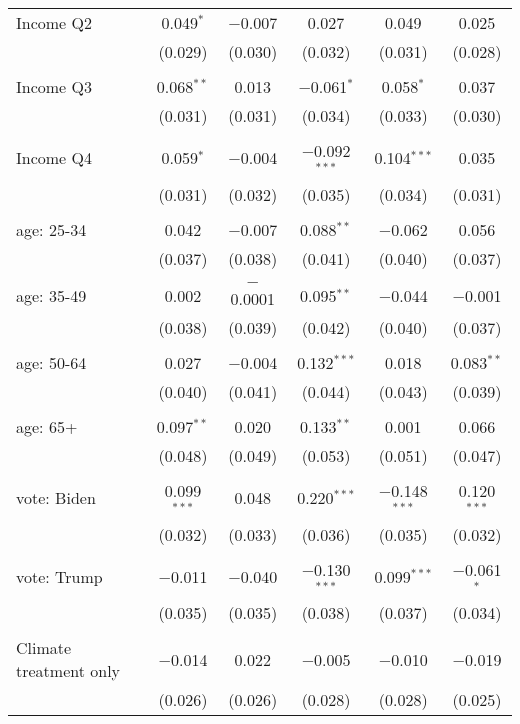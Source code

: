 \begin{tabular}{@{\extracolsep{5pt}}lccccc}
 Income Q2 & 0.049$^{*}$ & $-$0.007 & 0.027 & 0.049 & 0.025 \\ 
  & (0.029) & (0.030) & (0.032) & (0.031) & (0.028) \\ 
  & & & & & \\ 
 Income Q3 & 0.068$^{**}$ & 0.013 & $-$0.061$^{*}$ & 0.058$^{*}$ & 0.037 \\ 
  & (0.031) & (0.031) & (0.034) & (0.033) & (0.030) \\ 
  & & & & & \\ 
 Income Q4 & 0.059$^{*}$ & $-$0.004 & $-$0.092$^{***}$ & 0.104$^{***}$ & 0.035 \\ 
  & (0.031) & (0.032) & (0.035) & (0.034) & (0.031) \\ 
  & & & & & \\ 
 age: 25-34 & 0.042 & $-$0.007 & 0.088$^{**}$ & $-$0.062 & 0.056 \\ 
  & (0.037) & (0.038) & (0.041) & (0.040) & (0.037) \\ 
  & & & & & \\ 
 age: 35-49 & 0.002 & $-$0.0001 & 0.095$^{**}$ & $-$0.044 & $-$0.001 \\ 
  & (0.038) & (0.039) & (0.042) & (0.040) & (0.037) \\ 
  & & & & & \\ 
 age: 50-64 & 0.027 & $-$0.004 & 0.132$^{***}$ & 0.018 & 0.083$^{**}$ \\ 
  & (0.040) & (0.041) & (0.044) & (0.043) & (0.039) \\ 
  & & & & & \\ 
 age: 65+ & 0.097$^{**}$ & 0.020 & 0.133$^{**}$ & 0.001 & 0.066 \\ 
  & (0.048) & (0.049) & (0.053) & (0.051) & (0.047) \\ 
  & & & & & \\ 
 vote: Biden & 0.099$^{***}$ & 0.048 & 0.220$^{***}$ & $-$0.148$^{***}$ & 0.120$^{***}$ \\ 
  & (0.032) & (0.033) & (0.036) & (0.035) & (0.032) \\ 
  & & & & & \\ 
 vote: Trump & $-$0.011 & $-$0.040 & $-$0.130$^{***}$ & 0.099$^{***}$ & $-$0.061$^{*}$ \\ 
  & (0.035) & (0.035) & (0.038) & (0.037) & (0.034) \\ 
  & & & & & \\ 
 Climate treatment only & $-$0.014 & 0.022 & $-$0.005 & $-$0.010 & $-$0.019 \\ 
  & (0.026) & (0.026) & (0.028) & (0.028) & (0.025) \\ 

\end{tabular}
